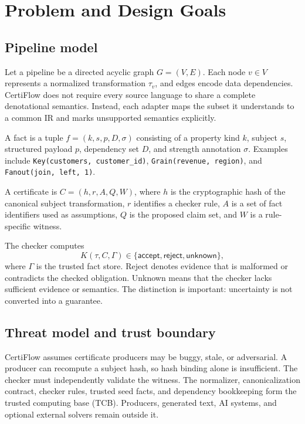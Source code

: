 \section{Problem and Design Goals}

\subsection{Pipeline model}

Let a pipeline be a directed acyclic graph $G=(V,E)$. Each node $v\in V$ represents a normalized transformation $\tau_v$, and edges encode data dependencies. CertiFlow does not require every source language to share a complete denotational semantics. Instead, each adapter maps the subset it understands to a common IR and marks unsupported semantics explicitly.

\begin{definition}[Fact]
A fact is a tuple $f=(k,s,p,D,\sigma)$ consisting of a property kind $k$, subject $s$, structured payload $p$, dependency set $D$, and strength annotation $\sigma$. Examples include \texttt{Key(customers, customer\_id)}, \texttt{Grain(revenue, region)}, and \texttt{Fanout(join, left, 1)}.
\end{definition}

\begin{definition}[Certificate]
A certificate is $C=(h,r,A,Q,W)$, where $h$ is the cryptographic hash of the canonical subject transformation, $r$ identifies a checker rule, $A$ is a set of fact identifiers used as assumptions, $Q$ is the proposed claim set, and $W$ is a rule-specific witness.
\end{definition}

The checker computes
\[
  K(\tau,C,\Gamma)\in\{\mathsf{accept},\mathsf{reject},\mathsf{unknown}\},
\]
where $\Gamma$ is the trusted fact store. \textsf{Reject} denotes evidence that is malformed or contradicts the checked obligation. \textsf{Unknown} means that the checker lacks sufficient evidence or semantics. The distinction is important: uncertainty is not converted into a guarantee.

\subsection{Threat model and trust boundary}

CertiFlow assumes certificate producers may be buggy, stale, or adversarial. A producer can recompute a subject hash, so hash binding alone is insufficient. The checker must independently validate the witness. The normalizer, canonicalization contract, checker rules, trusted seed facts, and dependency bookkeeping form the trusted computing base (TCB). Producers, generated text, AI systems, and optional external solvers remain outside it.


